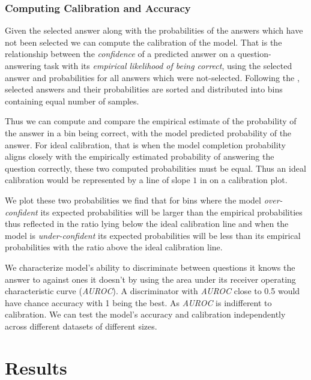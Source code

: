 \documentclass[11pt]{article}
\begin{document}
\subsubsection{Computing Calibration and Accuracy}

Given the selected answer along with the probabilities 
of the answers which have not been selected we can 
compute the calibration of the model.  That is the relationship between the \emph{confidence} 
of a predicted answer on a question-answering task 
with its \emph{empirical likelihood of being correct},
using the selected answer and probabilities for all answers which were not-selected. Following the \cite{kadavath2022language},  selected answers and their probabilities are sorted and distributed into bins containing equal number of samples.

Thus we can compute and compare the  empirical estimate of the probability of  the answer in a bin being correct, with the model predicted probability of the answer. For ideal calibration, that is when the model completion 
probability aligns closely with the empirically estimated probability of answering the question correctly, these  two computed probabilities must be equal. Thus an  ideal calibration would be represented by a line of slope $1$ in 
on a calibration plot.

We plot these two probabilities we find that for bins 
where the model \emph{over-confident} its expected 
probabilities will be larger than the empirical probabilities 
thus reflected in the ratio lying below the ideal calibration 
line and when the model is \emph{under-confident} its 
expected probabilities will be less than its empirical  
probabilities with the ratio above the 
ideal calibration line.

We characterize model's ability to discriminate between questions it knows the answer to against ones it doesn't  by using the area under its receiver operating characteristic curve (\emph{AUROC}). A discriminator with \emph{AUROC}  close to 0.5 would  have chance accuracy with 1 being the best. As \emph{AUROC} is indifferent to calibration. We can test the model's accuracy and calibration independently across different datasets of different sizes.

\section{Results}

\end{document}
